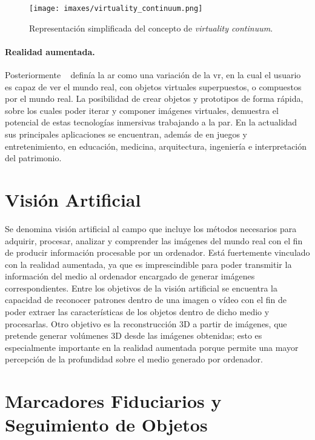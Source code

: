 \begin{figure}
	\centering
	\texttt{[image: imaxes/virtuality\_continuum.png]}
	\caption{Representación simplificada del concepto de \emph{virtuality continuum}.}
	\label{fig:vc}
\end{figure}

\paragraph{Realidad aumentada.}
Posteriormente \citeauthor{Azuma1997}~\cite{Azuma1997} definía la \acrlong{ar} como una variación de la \acrlong{vr}, en la cual el usuario es capaz de ver el mundo real, con objetos virtuales superpuestos, o compuestos por el mundo real. La posibilidad de crear objetos y prototipos de forma rápida, sobre los cuales poder iterar y componer imágenes virtuales, demuestra el potencial de estas tecnologías inmersivas trabajando a la par. En la actualidad sus principales aplicaciones se encuentran, además de en juegos y entretenimiento, en educación, medicina, arquitectura, ingeniería e interpretación del patrimonio.

\section{Visión Artificial}

Se denomina visión artificial al campo que incluye los métodos necesarios para adquirir, procesar, analizar y comprender las imágenes del mundo real con el fin de producir información procesable por un ordenador. Está fuertemente vinculado con la realidad aumentada, ya que es imprescindible para poder transmitir la información del medio al ordenador encargado de generar imágenes correspondientes.
Entre los objetivos de la visión artificial se encuentra la capacidad de reconocer patrones dentro de una imagen o vídeo con el fin de poder extraer las características de los objetos dentro de dicho medio y procesarlas.
Otro objetivo es la reconstrucción 3D a partir de imágenes, que pretende generar volúmenes 3D desde las imágenes obtenidas; esto es especialmente importante en la realidad aumentada porque permite una mayor percepción de la profundidad sobre el medio generado por ordenador.

\section{Marcadores Fiduciarios y Seguimiento de Objetos}

